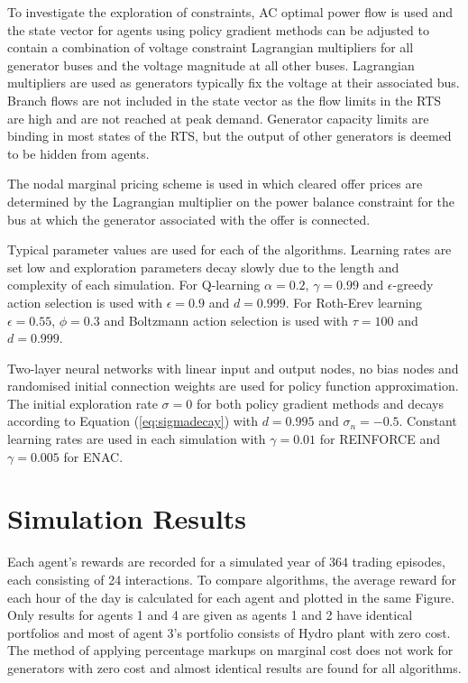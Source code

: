 To investigate the exploration of constraints, AC optimal power flow is used and
the state vector for agents using policy gradient methods can be adjusted to
contain a combination of voltage constraint Lagrangian multipliers for all
generator buses and the voltage magnitude at all other buses.  Lagrangian
multipliers are used as generators typically fix the voltage at their associated
bus.  Branch flows are not included in the state vector as the flow limits in
the RTS are high and are not reached at peak demand.  Generator capacity limits
are binding in most states of the RTS, but the output of other generators is
deemed to be hidden from agents.

The nodal marginal pricing scheme is used in which cleared offer prices are
determined by the Lagrangian multiplier on the power balance constraint for the
bus at which the generator associated with the offer is connected.

Typical parameter values are used for each of the algorithms.  Learning rates
are set low and exploration parameters decay slowly due to the length
and complexity of each simulation.  For Q-learning $\alpha=0.2$, $\gamma=0.99$
and $\epsilon$-greedy action selection is used with $\epsilon=0.9$ and
$d=0.999$. For Roth-Erev learning $\epsilon=0.55$, $\phi=0.3$ and Boltzmann
action selection is used with $\tau=100$ and $d=0.999$.

Two-layer neural networks with linear input and output nodes, no bias nodes and
randomised initial connection weights are used for policy function
approximation.  The initial exploration rate $\sigma=0$ for both policy
gradient methods and decays according to Equation (\ref{eq:sigmadecay}) with
$d=0.995$ and $\sigma_n=-0.5$.  Constant learning rates are used in each
simulation with $\gamma=0.01$ for REINFORCE and $\gamma=0.005$ for ENAC.

\section{Simulation Results}
Each agent's rewards are recorded for a simulated year of 364 trading episodes,
each consisting of 24 interactions.  To compare algorithms, the average reward
for each hour of the day is calculated for each agent and plotted in the
same Figure.  Only results for agents 1 and 4 are given as agents 1 and 2 have
identical portfolios and most of agent 3's portfolio consists of Hydro plant
with zero cost.  The method of applying percentage markups on marginal cost does
not work for generators with zero cost and almost identical results are found
for all algorithms.

